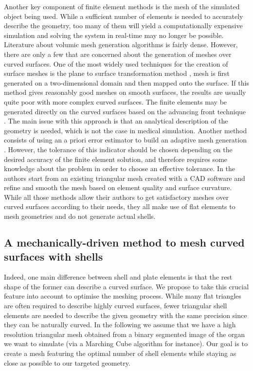\documentclass{llncs}
\begin{document}
Another key component of finite element methods is the mesh of the simulated object being used. While a sufficient number of elements is needed to accurately describe the geometry, too many of them will yield a computationally expensive simulation and solving the system in real-time may no longer be possible. Literature about volumic mesh generation algorithms is fairly dense. However, there are only a few that are concerned about the generation of meshes over curved surfaces. One of the most widely used techniques for the creation of surface meshes is the plane to surface transformation method \cite{Zienkiewicz71}, mesh is first generated on a two-dimensional domain and then mapped onto the surface. If this method gives reasonably good meshes on smooth surfaces, the results are usually quite poor with more complex curved surfaces. The finite elements may be generated directly on the curved surfaces based on the advancing front technique \cite{Lo85,Lau96}. The main issue with this approach is that an analytical description of the geometry is needed, which is not the case in medical simulation. Another method consists of using an a priori error estimator to build an adaptive mesh generation \cite{Baumann97}. However, the tolerance of this indicator should be chosen depending on the desired accuracy of the finite element solution, and therefore requires some knowledge about the problem in order to choose an effective tolerance. In \cite{Bechet02} the authors start from an existing triangular mesh created with a CAD software and refine and smooth the mesh based on element quality and surface curvature. While all those methods allow their authors to get satisfactory meshes over curved surfaces according to their needs, they all make use of flat elements to mesh geometries and do not generate actual shells. 

\subsection{A mechanically-driven method to mesh curved surfaces with shells}

Indeed, one main difference between shell and plate elements is that the rest shape of the former can describe a curved surface. We propose to take this crucial feature into account to optimise the meshing process. While many flat triangles are often required to describe highly curved surfaces, fewer triangular shell elements are needed to describe the given geometry with the same precision since they can be naturally curved. In the following we assume that we have a high resolution triangular mesh obtained from a binary segmented image of the organ we want to simulate (via a Marching Cube algorithm for instance). Our goal is to create a mesh featuring the optimal number of shell elements while staying as close as possible to our targeted geometry. 
\end{document}
